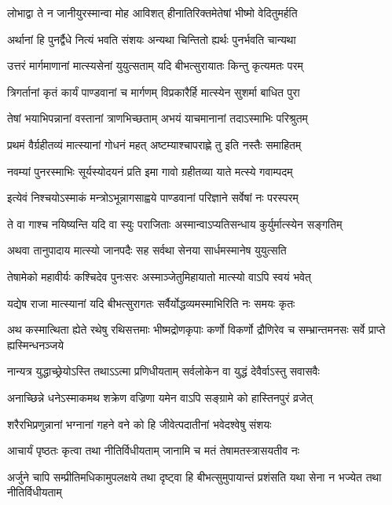 \twolineshloka
{लोभाद्वा ते न जानीयुरस्मान्वा मोह आविशत्}
{हीनातिरिक्तमेतेषां भीष्मो वेदितुमर्हति}


\twolineshloka
{अर्थानां हि पुनर्द्वैधे नित्यं भवति संशयः}
{अन्यथा चिन्तितो ह्यर्थः पुनर्भवति चान्यथा}


\twolineshloka
{उत्तरं मार्गमाणानां मात्स्यसेनां युयुत्सताम्}
{यदि बीभत्सुरायातः किन्तु कृत्यमतः परम्}


\twolineshloka
{त्रिगर्तानां कृतं कार्यं पाण्डवानां च मार्गणम्}
{विप्रकारैर्हि मात्स्येन सुशर्मा बाधित पुरा}


\twolineshloka
{तेषां भयाभिपन्नानां वस्तानां त्राणभिच्छताम्}
{अभयं याचमानानां तदाऽस्माभिः परिश्रुतम्}


\twolineshloka
{प्रथमं वैर्ग्रहीतव्यं मात्स्यानां गोधनं महत्}
{अष्टम्याश्चापराह्णे तु इति नस्तैः समाहितम्}


\twolineshloka
{नवम्यां पुनरस्माभिः सूर्यस्योदयनं प्रति}
{इमा गावो ग्रहीतव्या याते मत्स्ये गवाम्पदम्}


\twolineshloka
{इत्येवं निश्चयोऽस्माकं मन्त्रोऽभून्नागसाह्वये}
{पाण्डवानां परिज्ञाने सर्वेषां नः परस्परम्}


\twolineshloka
{ते वा गाश्च नयिष्यन्ति यदि वा स्युः पराजिताः}
{अस्मान्वाऽप्यतिसन्धाय कुर्युर्मात्स्येन सङ्गतिम्}


\twolineshloka
{अथवा तानुपादाय मात्स्यो जानपदैः सह}
{सर्वथा सेनया सार्धमस्मानेष युयुत्सति}


\twolineshloka
{तेषामेको महावीर्यः कश्चिदेव पुनःसरः}
{अस्माञ्जेतुमिहायातो मात्स्यो वाऽपि स्वयं भवेत्}


\twolineshloka
{यद्येष राजा मात्स्यानां यदि बीभत्सुरागतः}
{सर्वैर्योद्धव्यमस्माभिरिति नः समयः कृतः}


\threelineshloka
{अथ कस्मात्थिता ह्येते रथेषु रथिसत्तमाः}
{भीष्मद्रोणकृपाः कर्णो विकर्णो द्रौणिरेव च}
{सम्भ्रान्तमनसः सर्वे प्राप्ते ह्यस्मिन्धनञ्जये}


\twolineshloka
{नान्यत्र युद्धाच्छ्रेयोऽस्ति तथाऽऽत्मा प्रणिधीयताम्}
{सर्वलोकेन वा युद्धं देवैर्वाऽस्तु सवासवैः}


\twolineshloka
{अनाच्छिन्ने धनेऽस्माकमथ शक्रेण वज्रिणा}
{यमेन वाऽपि सङ्ग्रामे को हास्तिनपुरं व्रजेत्}


\twolineshloka
{शरैरभिप्रणुन्नानां भग्नानां गहने वने}
{को हि जीवेत्पदातीनां भवेदश्वेषु संशयः}


\twolineshloka
{आचार्यं पृष्ठतः कृत्वा तथा नीतिर्विधीयताम्}
{जानामि च मतं तेषामतस्त्रासयतीव नः}


\threelineshloka
{अर्जुने चापि सम्प्रीतिमधिकामुपलक्षये}
{तथा दृष्ट्वा हि बीभत्सुमुपायान्तं प्रशंसति}
{यथा सेना न भज्येत तथा नीतिर्विधीयताम्}


